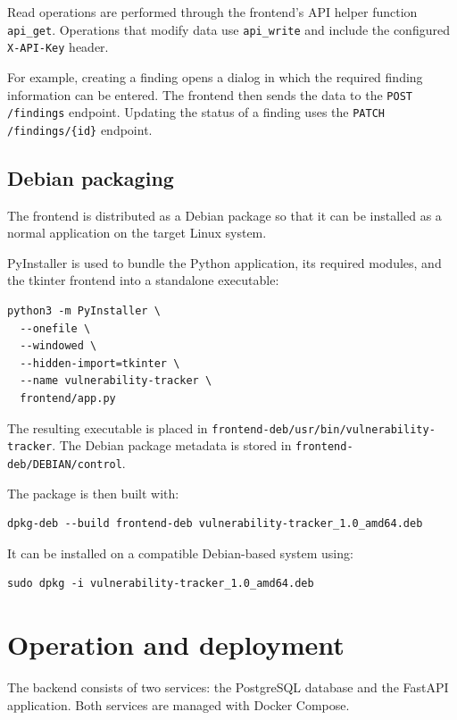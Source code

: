 \documentclass[11pt,a4paper]{article}
\begin{document}
Read operations are performed through the frontend's API helper function
\texttt{api\_get}. Operations that modify data use \texttt{api\_write} and
include the configured \texttt{X-API-Key} header.

For example, creating a finding opens a dialog in which the required finding
information can be entered. The frontend then sends the data to the
\texttt{POST /findings} endpoint. Updating the status of a finding uses the
\texttt{PATCH /findings/\{id\}} endpoint.

\subsection{Debian packaging}

The frontend is distributed as a Debian package so that it can be installed
as a normal application on the target Linux system.

PyInstaller is used to bundle the Python application, its required modules,
and the tkinter frontend into a standalone executable:

\begin{verbatim}
python3 -m PyInstaller \
  --onefile \
  --windowed \
  --hidden-import=tkinter \
  --name vulnerability-tracker \
  frontend/app.py
\end{verbatim}

The resulting executable is placed in
\texttt{frontend-deb/usr/bin/vulnerability-tracker}. The Debian package
metadata is stored in \texttt{frontend-deb/DEBIAN/control}.

The package is then built with:

\begin{verbatim}
dpkg-deb --build frontend-deb vulnerability-tracker_1.0_amd64.deb
\end{verbatim}

It can be installed on a compatible Debian-based system using:

\begin{verbatim}
sudo dpkg -i vulnerability-tracker_1.0_amd64.deb
\end{verbatim}

\section{Operation and deployment}

The backend consists of two services: the PostgreSQL database and the FastAPI
application. Both services are managed with Docker Compose.
\end{document}
